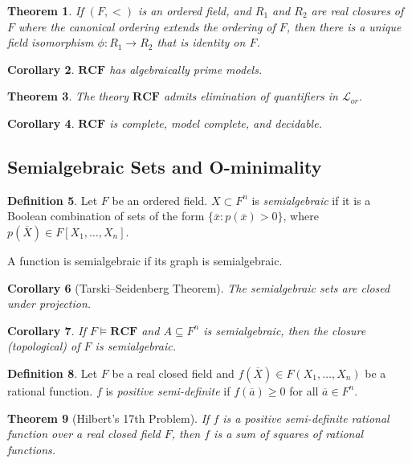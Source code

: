 \documentclass{amsart}
\newtheorem{theorem}{Theorem}[subsection]
\newtheorem{corollary}[theorem]{Corollary}
\theoremstyle{definition}
\newtheorem{definition}[theorem]{Definition}
\numberwithin{equation}{section}
\begin{document}
\begin{theorem}
  If $(F,<)$ is an ordered field,
  and $R_1$ and $R_2$ are real closures of $F$ where the canonical ordering extends the ordering of $F$,
  then there is a unique field isomorphism $\phi: R_1 \to R_2$ that is identity on $F$.
\end{theorem}

\begin{corollary}
  $\mathbf{RCF}$ has algebraically prime models.
\end{corollary}

\begin{theorem}
  The theory $\mathbf{RCF}$ admits elimination of quantifiers in $\mathcal{L}_{or}$.
\end{theorem}

\begin{corollary}
  $\mathbf{RCF}$ is complete, model complete, and decidable.
\end{corollary}

\subsection{Semialgebraic Sets and O-minimality}
\begin{definition}
  Let $F$ be an ordered field.
  $X \subset F^n$ is \emph{semialgebraic} if it is a Boolean combination of sets of the form $\{\overline{x}:p(\overline{x})>0\}$,
  where $p(\overline{X}) \in F[X_1,\dots,X_n]$.

  A function is semialgebraic if its graph is semialgebraic.
\end{definition}

\begin{corollary}[Tarski--Seidenberg Theorem]
  The semialgebraic sets are closed under projection.
\end{corollary}

\begin{corollary}
  If $F \models \mathbf{RCF}$ and $A \subseteq F^n$ is semialgebraic,
  then the closure (topological) of $F$ is semialgebraic.
\end{corollary}

\begin{definition}
  Let $F$ be a real closed field and
  $f(\overline{X}) \in F(X_1,\dots,X_n)$ be a rational function.
  $f$ is \emph{positive semi-definite} if $f(\overline{a}) \ge 0$ for all $\overline{a} \in F^n$.
\end{definition}

\begin{theorem}[Hilbert's 17th Problem]
  If $f$ is a positive semi-definite rational function over a real closed field $F$,
  then $f$ is a sum of squares of rational functions.
\end{theorem}
\end{document}
